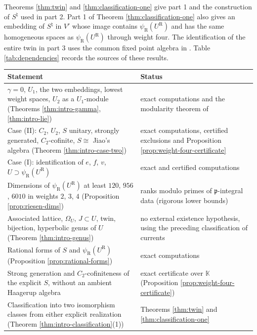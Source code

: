 \documentclass[leqno]{article}
\newcommand{\K}{\ensuremath{\mathbb{K}}}
\numberwithin{equation}{section}
\begin{document}
Theorems \ref{thm:twin} and \ref{thm:classification-one} give part 1 and the construction of $S^\natural$ used in part 2. Part 1 of Theorem \ref{thm:classification-one} also gives an embedding of $S^\natural$ in $V'$ whose image contains $\psi_{\mathrm R}(U^{\mathrm R})$ and has the same homogeneous spaces as $\psi_{\mathrm R}(U^{\mathrm R})$ through weight four. The identification of the entire twin in part 3 uses the common fixed point algebra in \cite[Section 7]{ArhIII}. Table \ref{tab:dependencies} records the sources of these results.

\begin{table}[ht]
\centering
\small
\begin{tabular}{p{7.4cm}p{6cm}}
\hline
Statement & Status \\
\hline
$\gamma = 0$, $U_1$, the two embeddings, lowest weight spaces, $U_2$ as a $U_1$-module (Theorems \ref{thm:intro-gamma}, \ref{thm:intro-lie}) & exact computations and the modularity theorem of \cite{EvG11} \\
Case (II): $C_2$, $U_2$, $S$ unitary, strongly generated, $C_2$-cofinite, $S \cong$ Jiao's algebra (Theorem \ref{thm:intro-case-two}) & exact computations, certified exclusions and Proposition \ref{prop:weight-four-certificate} \\
Case (I): identification of $e$, $f$, $v$, $U \supset \psi_{\mathrm R}(U^{\mathrm R})$ & exact and certified computations \\
Dimensions of $\psi_{\mathrm R}(U^{\mathrm R})$ at least $120$, $956$, $6010$ in weights $2$, $3$, $4$ (Proposition \ref{prop:riesen-dims}) & ranks modulo primes of $\mathfrak p$-integral data (rigorous lower bounds) \\
Associated lattice, $\Omega_U$, $J \subset U$, twin, bijection, hyperbolic genus of $U$ (Theorem \ref{thm:intro-genus}) & no external existence hypothesis, using the preceding classification of currents \\
Rational forms of $S$ and $\psi_{\mathrm R}(U^{\mathrm R})$ (Proposition \ref{prop:rational-forms}) & exact computations \\
Strong generation and $C_2$-cofiniteness of the explicit $S$, without an ambient Haagerup algebra & exact certificate over $\K$ (Proposition \ref{prop:weight-four-certificate}) \\
Classification into two isomorphism classes from either explicit realization (Theorem \ref{thm:intro-classification}(1)) & Theorems \ref{thm:twin} and \ref{thm:classification-one} \\

\end{tabular}
\end{table}
\end{document}
